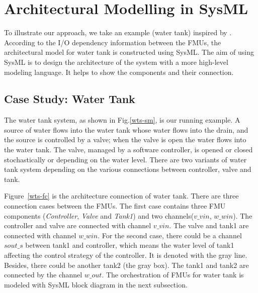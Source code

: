 
\section{Architectural Modelling in SysML}
\label{sec:sysml}
To illustrate our approach, we take an example (water tank) inspired by \cite{AmalioPCW16}. According to the I/O dependency information between the FMUs, the architectural model for water tank is constructed using SysML. The aim of using SysML is to design the architecture of the system with a more high-level modeling language. It helps to show the components and their connection.
\subsection{Case Study: Water Tank}

The water tank system, as shown in Fig.\ref{wts-sm}, is our running example. A source of water flows into the water tank whose water flows into the drain, and the source is controlled by a valve; when the valve is open the water flows into the water tank. The valve, managed by a software controller, is opened or closed stochastically or depending on the water level. There are two variants of water tank system depending on the various connections between controller, valve and tank. 

Figure~\ref{wts-fc} is the architecture connection of water tank. There are three connection cases between the FMUs. The first case contains three FMU components (\emph{Controller}, \emph{Valve} and \emph{ Tank1}) and two channels($v \_ vin$, $w \_ win$). The controller and valve are connected with channel $v \_ vin$. The valve and tank1 are connected with channel $w \_ win$. For the second case, there could be a channel $sout \_ s$ between tank1 and controller, which means the water level of tank1 affecting the control strategy of the controller. It is denoted with the gray line. Besides, there could be another tank2 (the gray box). The tank1 and tank2 are connected by the channel $w \_ out$. The orchestration of FMUs for water tank is modeled with SysML block diagram in the next subsection.

\begin{figure}[htbp]
\end{figure}
